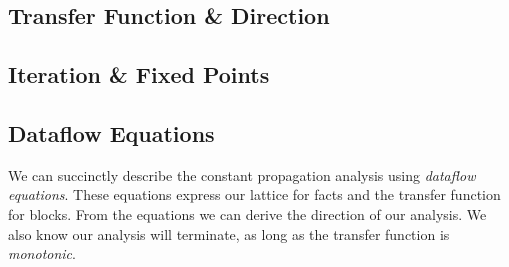 \documentclass[12pt]{report}
\begin{document}








\subsection{Transfer Function \& Direction}
\label{back_subsec_transfer}

\subsection{Iteration \& Fixed Points}
\label{back_subsec_iter}

\subsection{Dataflow Equations}
\label{back_subsec_eq}

We can succinctly describe the constant propagation analysis using
\emph{dataflow equations}. These equations express our lattice for
facts and the transfer function for blocks. From the equations
we can derive the direction of our analysis. We also know our
analysis will terminate, as long as the transfer function is 
\emph{monotonic}. 
\end{document}
